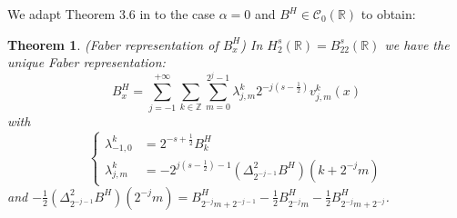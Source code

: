 \documentclass[11pt]{article}
\newtheorem{theo}{Theorem}
\newcommand{\R}{\mathbb{R}}
\newcommand{\Z}{\mathbb{Z}}
\begin{document}
We adapt Theorem 3.6 in \cite{Tri-fab} to the case $\alpha=0$ and $B^H\in\mathcal{C}_0(\R)$ to obtain:

\begin{theo}(Faber representation of $B^H_x$)
    In $H^s_2(\R)=B^s_{22}(\R)$ we have the unique Faber representation:
    \begin{equation}
    B^H_x = \sum_{j=-1}^{+\infty}\sum_{k\in\Z}\sum_{m=0}^{2^j-1}\lambda_{j,m}^k2^{-j\left(s-\frac{1}{2}\right)}v_{j,m}^k(x)
    \end{equation}    
    with \begin{equation}
    \begin{cases}
    \lambda^k_{-1,0} & = 2^{-s+\frac{1}{2}}B^H_k\\
    \lambda^k_{j,m} & = -2^{j(s-\frac{1}{2})-1} (\Delta^2_{2^{-j-1}}B^H)(k+2^{-j}m)
    \end{cases}
    \end{equation}
    and $-\frac{1}{2}(\Delta^2_{2^{-j-1}}B^H)(2^{-j}m) = B^H_{2^{-j}m+2^{-j-1}}-\frac{1}{2}B^H_{2^{-j}m}-\frac{1}{2}B^H_{2^{-j}m+2^{-j}}$.
\end{theo}
\end{document}

